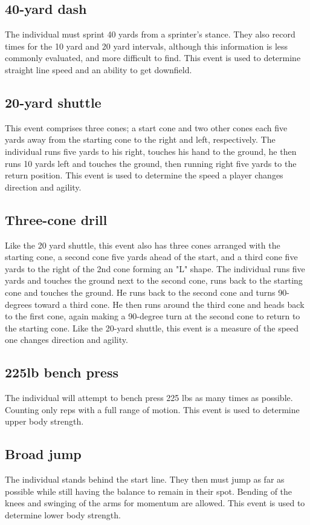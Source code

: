 \documentclass[confrence]{IEEEtran}
\begin{document}
\subsection*{40-yard dash}
The individual must sprint 40 yards from a sprinter's stance. They also record times for the 10 yard and 20 yard intervals, although this information is less commonly evaluated, and more difficult to find.
This event is used to determine straight line speed and an ability to get downfield.
\subsection*{20-yard shuttle}
This event comprises three cones; a start cone and two other cones each five yards away from the starting cone to the right and left, respectively.
The individual runs five yards to his right, touches his hand to the ground, he then runs 10 yards left and touches the ground, then running right five yards to the return position.
This event is used to determine the speed a player changes direction and agility.
\subsection*{Three-cone drill}
Like the 20 yard shuttle, this event also has three cones arranged with the starting cone, a second cone five yards ahead of the start, and a third cone five yards to the right of the 2nd cone forming an "L" shape.
The individual runs five yards and touches the ground next to the second cone, runs back to the starting cone and touches the ground.
He runs back to the second cone and turns 90-degrees toward a third cone.
He then runs around the third cone and heads back to the first cone, again making a 90-degree turn at the second cone to return to the starting cone.
Like the 20-yard shuttle, this event is a measure of the speed one changes direction and agility.
\subsection*{225lb bench press}
The individual will attempt to bench press 225 lbs as many times as possible.
Counting only reps with a full range of motion.
This event is used to determine upper body strength.
\subsection*{Broad jump}
The individual stands behind the start line.
They then must jump as far as possible while still having the balance to remain in their spot.
Bending of the knees and swinging of the arms for momentum are allowed.
This event is used to determine lower body strength.
\end{document}
